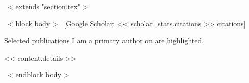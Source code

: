 ~< extends "section.tex" >~

~< block body >~
\vspace{-8.2mm}\hspace{30mm}[\href{https://scholar.google.com/citations?user=<< scholar_id >>}{Google Scholar}: << scholar_stats.citations >> citations]\vspace{3mm}

\setlength\fboxsep{2pt}
Selected publications I am a primary author on are \hspace{-\fboxsep}\colorbox{tab_highlight}{highlighted.}




<< content.details >>

~< endblock body >~
